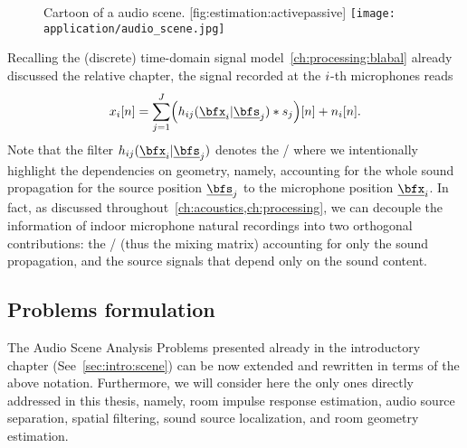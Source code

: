 \begin{figure}[]
    \begin{sidecaption}{%
        Cartoon of a audio scene.
    }[fig:estimation:activepassive]
    \centering
    \texttt{[image: application/audio\_scene.jpg]}
    \end{sidecaption}
\end{figure}

Recalling the (discrete) time-domain signal model~\cref{ch:processing:blabal} already discussed the relative chapter, the signal recorded at the $i$-th microphones reads
\begin{equation}
    \label{eq:application:stft}
    \mic_\idxMic[n] = \sum_{\idxSrc = 1}^{\numSrcs}
        \kparen{\flt_{\idxMicSrc}( \positionMicrophone_{\idxMic}  | \positionSource_{\idxSrc}) \convDis \src_{\idxSrc}} [n] + \nse_\idxMic[n]
    .
\end{equation}
Note that the filter $\flt_{\idxMicSrc}(\positionMicrophone_{\idxMic} | \positionSource_{\idxSrc})$ denotes the \RIR/ where we intentionally highlight the dependencies on geometry,
namely, accounting for the whole sound propagation for the source position $\positionSource_{\idxSrc}$ to the microphone position $\positionMicrophone_{\idxMic}$.
In fact, as discussed throughout~\cref{ch:acoustics,ch:processing}, we can decouple the information of indoor microphone natural recordings into two orthogonal contributions:
the \RIRs/ (thus the mixing matrix) accounting for only the sound propagation, and the source signals that depend only on the sound content.

\newcommand{\setMicSignals}{\ensuremath{\set{\mic_{\idxMic}}_\idxMic}}
\newcommand{\setSrcSignals}{\ensuremath{\set{\src_{\idxSrc}}_\idxSrc}}
\newcommand{\setSrcPositions}{\ensuremath{\set{\positionSource_{\idxSrc}}_\idxSrc}}
\newcommand{\setFltSignals}{\ensuremath{\set{\flt_{\idxMicSrc}(\positionMicrophone_{\idxMic} | \positionSource_{\idxSrc})}_{\idxMicSrc}}}


\subsection{Problems formulation}
The Audio Scene Analysis Problems presented already in the introductory chapter (See~\cref{sec:intro:scene}) can be now extended and rewritten in terms of the above notation.
Furthermore, we will consider here the only ones directly addressed in this thesis, namely, room impulse response estimation, audio source separation, spatial filtering, sound source localization, and room geometry estimation.

